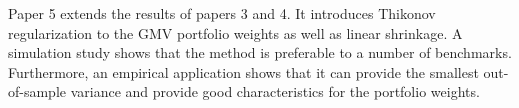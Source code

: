 Paper 5 extends the results of papers 3 and 4. 
It introduces Thikonov regularization to the GMV portfolio weights as well as linear shrinkage.
A simulation study shows that the method is preferable to a number of benchmarks. 
Furthermore, an empirical application shows that it can provide the smallest out-of-sample variance and provide good characteristics for the portfolio weights.